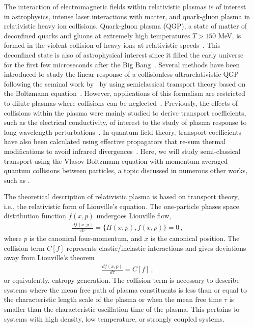 The interaction of electromagnetic fields within relativistic plasmas is of interest in astrophysics, intense laser interactions with matter, and quark-gluon plasma in relativistic heavy ion collisions. Quark-gluon plasma (QGP), a state of matter of deconfined quarks and gluons at extremely high temperatures $T>150$ MeV, is formed in the violent collision of heavy ions at relativistic speeds~\cite{Letessier:2002ony}. This deconfined state is also of astrophysical interest since it filled the early universe for the first few microseconds after the Big Bang~\cite{rafelski2013connecting}. Several methods have been introduced to study the linear response of a collisionless ultrarelativistic QGP following the seminal work by~\cite{Weldon:1982aq} by using semiclassical transport theory based on the Boltzmann equation~\cite{Mrowczynski:1987jr,Mrowczynski:1989np,Blaizot:1993zk,Kelly:1994ig,Kelly:1994dh}. However, applications of this formalism are restricted to dilute plasmas where collisions can be neglected~\cite{Blaizot:2001nr}. 
Previously, the effects of collisions within the plasma were mainly studied to derive transport coefficients, such as the electrical conductivity, of interest to the study of plasma response to long-wavelength perturbations~\cite{Mrowczynski:1988xu,Heiselberg:1993cr,Ahonen:1996nq,Baym:1997gq,Ahonen:1998iz}. In quantum field theory, transport coefficients have also been calculated using effective propagators that re-sum thermal modifications to avoid infrared divergences~\cite{Heiselberg:1994ms,Arnold:2002zm,Arnold:2003zc}. Here, we will study semi-classical transport using the Vlasov-Boltzmann equation with momentum-averaged quantum collisions between particles, a topic discussed in numerous other works, such as \cite{DeGroot:1980dk,Cercignani:2002bk,Hakim:2011bk,Carrington:2003je,Schenke:2006xu}.


The theoretical description of relativistic plasma is based on transport theory, i.e., the relativistic form of Liouville's equation. The one-particle phases space distribution function $f(x,p)$ undergoes Liouville flow,
\begin{align}
    \frac{d f(x,p)}{d\tau} = \{H(x,p), f(x,p)\} = 0\,,
\end{align}
where $p$ is the canonical four-momentum, and $x$ is the canonical position. The collision term $C[f]$ represents elastic/inelastic interactions and gives deviations away from Liouville's theorem
\begin{align}\label{eq:LpC}
    \frac{d f(x,p)}{d\tau} = C[f]\,,
\end{align}
or equivalently, entropy generation. The collision term is necessary to describe systems where the mean free path of plasma constituents is less than or equal to the characteristic length scale of the plasma or when the mean free time $\tau$ is smaller than the characteristic oscillation time of the plasma. This pertains to systems with high density, low temperature, or strongly coupled systems.

